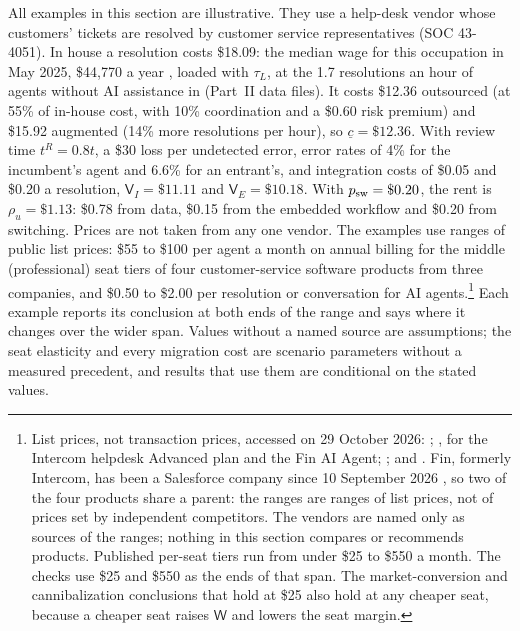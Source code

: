 All examples in this section are illustrative. They use a help-desk vendor whose customers' tickets are resolved by customer service representatives (SOC 43-4051). In house a resolution costs \$18.09: the median wage for this occupation in May 2025, \$44{,}770 a year \citep{bls2026oews}, loaded with $\tau_L$, at the 1.7 resolutions an hour of agents without AI assistance in \citet{brynjolfsson2025generative} (Part~II data files). It costs \$12.36 outsourced (at 55\% of in-house cost, with 10\% coordination and a \$0.60 risk premium) and \$15.92 augmented (14\% more resolutions per hour), so $\underline c=\$12.36$. With review time $t^R=0.8t$, a \$30 loss per undetected error, error rates of 4\% for the incumbent's agent and 6.6\% for an entrant's, and integration costs of \$0.05 and \$0.20 a resolution, $\mathsf V_I=\$11.11$ and $\mathsf V_E=\$10.18$. With $p_{\rm sw}=\$0.20$, the rent is $\rho_u=\$1.13$: \$0.78 from data, \$0.15 from the embedded workflow and \$0.20 from switching. Prices are not taken from any one vendor. The examples use ranges of public list prices: \$55 to \$100 per agent a month on annual billing for the middle (professional) seat tiers of four customer-service software products from three companies, and \$0.50 to \$2.00 per resolution or conversation for AI agents.\footnote{\label{fn:prod-prices}List prices, not transaction prices, accessed on 29 October 2026: \citet{freshworks2026pricing}; \citet{fin2026pricing}, for the Intercom helpdesk Advanced plan and the Fin AI Agent; \citet{salesforce2026servicepricing,salesforce2026agentforce}; and \citet{hubspot2026servicepro,hubspot2026customeragent}. Fin, formerly Intercom, has been a Salesforce company since 10 September 2026 \citep{salesforce2026finclose}, so two of the four products share a parent: the ranges are ranges of list prices, not of prices set by independent competitors. The vendors are named only as sources of the ranges; nothing in this section compares or recommends products. Published per-seat tiers run from under \$25 to \$550 a month. The checks use \$25 and \$550 as the ends of that span. The market-conversion and cannibalization conclusions that hold at \$25 also hold at any cheaper seat, because a cheaper seat raises $\mathsf W$ and lowers the seat margin.} Each example reports its conclusion at both ends of the range and says where it changes over the wider span. Values without a named source are assumptions; the seat elasticity and every migration cost are scenario parameters without a measured precedent, and results that use them are conditional on the stated values.


